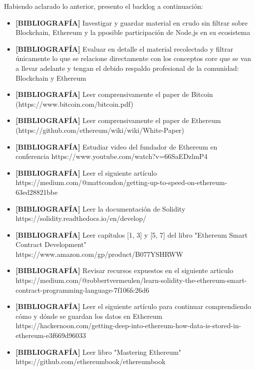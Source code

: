 Habiendo aclarado lo anterior, presento el backlog a continuación:

\begin{itemize}
\item \textbf{[BIBLIOGRAFÍA]} Investigar y guardar material en crudo sin filtrar sobre Blockchain, Ethereum y la pposible participación de Node.js en su ecosistema
\item \textbf{[BIBLIOGRAFÍA]} Evaluar en detalle el material recolectado y filtrar únicamente lo
que se relacione directamente con los conceptos core que se van a llevar adelante y tengan el
debido respaldo profesional de la comunidad: Blockchain y Ethereum
\item \textbf{[BIBLIOGRAFÍA]} Leer comprensivamente el paper de Bitcoin 
(https://www.bitcoin.com/bitcoin.pdf)
\item \textbf{[BIBLIOGRAFÍA]} Leer comprensivamente el paper de Ethereum 
(https://github.com/ethereum/wiki/wiki/White-Paper)
\item \textbf{[BIBLIOGRAFÍA]} Estudiar video del fundador de Ethereum en conferencia 
https://www.youtube.com/watch?v=66SaEDzlmP4
\item \textbf{[BIBLIOGRAFÍA]} Leer el siguiente artículo 
https://medium.com/@mattcondon/getting-up-to-speed-on-ethereum-63ed28821bbe
\item \textbf{[BIBLIOGRAFÍA]} Leer la documentación de Solidity https://solidity.readthedocs.io/en/develop/
\item \textbf{[BIBLIOGRAFÍA]} Leer capítulos [1, 3] y [5, 7] del libro "Ethereum Smart Contract Development" https://www.amazon.com/gp/product/B077YSHRWW
\item \textbf{[BIBLIOGRAFÍA]} Revisar recursos expuestos en el siguiente articulo 
https://medium.com/@robbertvermeulen/learn-solidity-the-ethereum-smart-contract-programming-language-7f106fc26d6
\item \textbf{[BIBLIOGRAFÍA]} Leer el siguiente artículo para continuar comprendiendo cómo y dónde
se guardan los datos en Ethereum https://hackernoon.com/getting-deep-into-ethereum-how-data-is-stored-in-ethereum-e3f669d96033
\item \textbf{[BIBLIOGRAFÍA]} Leer libro "Mastering Ethereum" https://github.com/ethereumbook/ethereumbook


\end{itemize}

